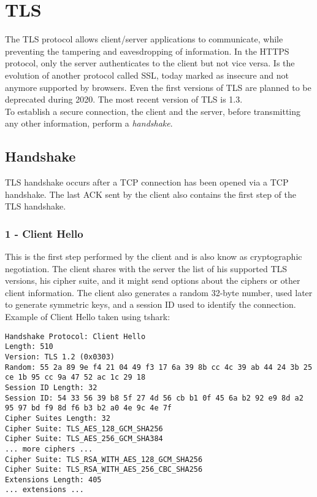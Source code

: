 \section{TLS}
The TLS protocol allows client/server applications to communicate, while preventing the tampering and eavesdropping of information. In the HTTPS protocol, only the server authenticates to the client but not vice versa. Is the evolution of another protocol called SSL, today marked as insecure and not anymore supported by browsers. Even the first versions of TLS are planned to be deprecated during 2020. The most recent version of TLS is 1.3.\\
To establish a secure connection, the client and the server, before transmitting any other information, perform a \emph{handshake}.
\subsection{Handshake}
TLS handshake occurs after a TCP connection has been opened via a TCP handshake. The last ACK sent by the client also contains the first step of the TLS handshake.
\subsubsection{1 - Client Hello}
This is the first step performed by the client and is also know as cryptographic negotiation. The client shares with the server the list of his supported TLS versions, his cipher suite, and it might send options about the ciphers or other client information. The client also generates a random 32-byte number, used later to generate symmetric keys, and a session ID used to identify the connection.\\
Example of Client Hello taken using tshark:
\begin{lstlisting}
Handshake Protocol: Client Hello
Length: 510
Version: TLS 1.2 (0x0303)
Random: 55 2a 89 9e f4 21 04 49 f3 17 6a 39 8b cc 4c 39 ab 44 24 3b 25 ce 1b 95 cc 9a 47 52 ac 1c 29 18
Session ID Length: 32
Session ID: 54 33 56 39 b8 5f 27 4d 56 cb b1 0f 45 6a b2 92 e9 8d a2 95 97 bd f9 8d f6 b3 b2 a0 4e 9c 4e 7f
Cipher Suites Length: 32
Cipher Suite: TLS_AES_128_GCM_SHA256
Cipher Suite: TLS_AES_256_GCM_SHA384
... more ciphers ...
Cipher Suite: TLS_RSA_WITH_AES_128_GCM_SHA256
Cipher Suite: TLS_RSA_WITH_AES_256_CBC_SHA256
Extensions Length: 405
... extensions ...
\end{lstlisting}

